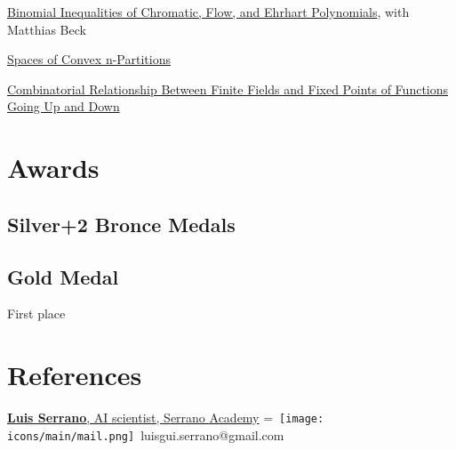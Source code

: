 \documentclass[]{plushcv}
\begin{document}
\begin{minipage}[t]{0.25\textwidth}
\textbullet{} \href{https://arxiv.org/abs/1804.00208}{Binomial Inequalities of Chromatic, Flow, and Ehrhart Polynomials}, with  Matthias Beck 

\textbullet{} \href{https://arxiv.org/abs/1511.02904}{Spaces of Convex n-Partitions}

\textbullet{} \href{https://arxiv.org/abs/2111.13745}{Combinatorial Relationship Between Finite Fields and Fixed Points of Functions Going Up and Down} 


\sectionsep


\section{Awards} 
\subsection{Silver+2 Bronce Medals}


\subsection{Gold Medal}
 First place




\section{References} 
\href{https://serrano.academy/}{\textbf{Luis Serrano}, AI scientist, Serrano Academy}
\begingroup
{}=\hbox{
\texttt{[image: icons/main/mail.png]}\hspace{0.3cm} luisgui.serrano@gmail.com
}
\parbox{\wd0}{}
\endgroup
\\


\end{minipage}
\end{document}
